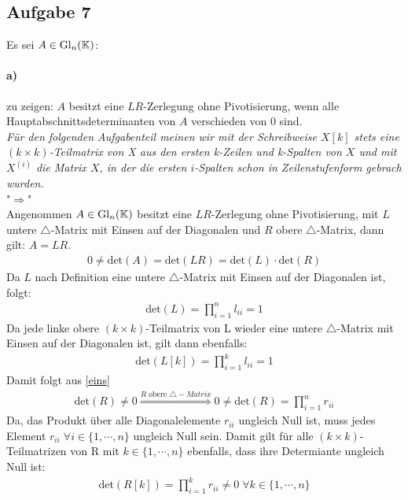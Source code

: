 \subsection*{Aufgabe 7}
Es sei $A \in \mathrm{Gl}_n (\mathbb K)$: 
\paragraph*{a)}
zu zeigen: $A$ besitzt eine $LR$-Zerlegung ohne Pivotisierung, wenn alle Hauptabschnittsdeterminanten von $A$ verschieden von 0 sind.\\
\newline
\textit{F\"ur den folgenden Aufgabenteil meinen wir mit der Schreibweise $X[k]$ stets eine $(k \times k)$-Teilmatrix von X aus den ersten k-Zeilen und k-Spalten von $X$ und mit $X^{(i)}$ die Matrix $X$, in der die ersten $i$-Spalten schon in Zeilenstufenform gebrach wurden.\\}
\newline
"$\Rightarrow$"\\
Angenommen $A \in \mathrm{Gl}_n (\mathbb K)$ besitzt eine $LR$-Zerlegung ohne Pivotisierung, mit $L$ untere $\triangle$-Matrix mit Einsen auf der Diagonalen und $R$ obere $\triangle$-Matrix, dann gilt:
\textit{} $A=LR$.
\begin{align}\label{eins}
0 \neq \mathrm{det}(A) = \mathrm{det}(LR) = \mathrm{det}(L)\cdot \mathrm{det}(R)
\end{align}
Da $L$ nach Definition eine untere $\triangle$-Matrix mit Einsen auf der Diagonalen ist, folgt:
\begin{align}
\mathrm{det}(L)=\prod_{i=1}^{n} l_{ii}=1
\end{align} 
Da jede linke obere $(k \times k)$-Teilmatrix von L wieder eine untere $\triangle$-Matrix mit Einsen auf der Diagonalen ist, gilt dann ebenfalls:
\begin{align}\label{drei}
\mathrm{det}(L[k])=\prod_{i=1}^{k} l_{ii}=1
\end{align}
Damit folgt aus \eqref{eins}
\begin{align}
\mathrm{det}(R) \neq 0 \overset{R\text{ obere }\triangle-Matrix}{\Rightarrow} 0 \neq \mathrm{det}(R)=\prod_{i=1}^{n} r_{ii}
\end{align}
Da, das Produkt \"uber alle Diagonalelemente $r_{ii}$ ungleich Null ist, muss jedes Element  $r_{ii} \; \forall i \in\{1,\cdots,n\}$ ungleich Null sein. Damit gilt f\"ur alle $(k \times k)$-Teilmatrizen von R mit  $k \in\{1,\cdots,n\}$ ebenfalls, dass ihre Determiante ungleich Null ist:
\begin{align}\label{fuenf}
\mathrm{det}(R[k])= \prod_{i=1}^{k} r_{ii} \neq 0 \; \forall k \in\{1,\cdots,n\}
\end{align} 
